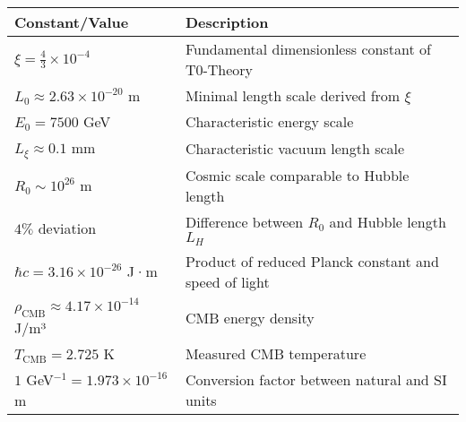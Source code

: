 \documentclass[12pt,a4paper]{article}
\numberwithin{equation}{section}
\begin{document}
\begin{longtable}{p{4cm} p{10cm}}
	\toprule
	\textbf{Constant/Value} & \textbf{Description} \\
	\midrule
	\endhead
	
	$\xi = \frac{4}{3} \times 10^{-4}$ & Fundamental dimensionless constant of T0-Theory \\
	$L_0 \approx 2.63 \times 10^{-20}$ m & Minimal length scale derived from $\xi$ \\
	$E_0 = 7500$ GeV & Characteristic energy scale \\
	$L_\xi \approx 0.1$ mm & Characteristic vacuum length scale \\
	$R_0 \sim 10^{26}$ m & Cosmic scale comparable to Hubble length \\
	$4\%$ deviation & Difference between $R_0$ and Hubble length $L_H$ \\
	$\hbar c = 3.16 \times 10^{-26}$ J·m & Product of reduced Planck constant and speed of light \\
	$\rho_{\text{CMB}} \approx 4.17 \times 10^{-14}$ J/m³ & CMB energy density \\
	$T_{\text{CMB}} = 2.725$ K & Measured CMB temperature \\
	$1$ GeV$^{-1} = 1.973 \times 10^{-16}$ m & Conversion factor between natural and SI units \\
	\bottomrule
\end{longtable}
	
\end{document}
